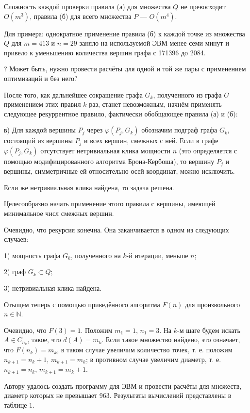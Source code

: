 \documentclass{article}
\begin{document}
Сложность каждой проверки правила (а) для множества $Q$ не превосходит $O(m^3)$, правила (б) для всего множества $P$ --- $O(m^4)$.

Для примера: однократное применение правила (б) к каждой точке из множества $Q$ для $m=413$ и $n=29$ заняло на используемой ЭВМ менее семи минут и привело к уменьшению количества вершин графа с 171396 до 2084.

? Может быть, нужно провести расчёты для одной и той же пары с применением оптимизаций и без него?

После того, как дальнейшее сокращение графа $G_k$, полученного из графа $G$ применением этих правил $k$ раз, станет невозможным, начнём применять следующее рекуррентное правило, фактически обобщающее правила (а) и (б):

в)
Для каждой вершины $P_j$ через $\varphi(P_j,G_k)$ обозначим подграф графа $G_k$, состоящий из вершины $P_j$ и всех вершин, смежных с ней.
Если в графе $\varphi(P_j,G_k)$ отсутствует нетривиальная клика мощности $n$ (это определяется с помощью модифицированного алгоритма Брона-Кербоша), то вершину $P_j$ и вершины, симметричные ей относительно осей координат, можно исключить.

Если же нетривиальная клика найдена, то задача решена.

Целесообразно начать применение этого правила с вершины, имеющей минимальное числ смежных вершин.

Очевидно, что рекурсия конечна.
Она заканчивается в одном из следующих случаев:

1) мощность графа $G_k$, полученного на $k$-й итерации, меньше $n$;

2) граф $G_k \subset Q$;

3) нетривиальная клика найдена.



Отыщем теперь с помощью приведённого алгоритма $F(n)$ для произвольного $n \in \mathbb{N}$.

Очевидно, что $F(3) = 1$.
Положим $m_1=1$, $n_1=3$.
На $k$-м шаге будем искать $A \in C_{n_k}$, такое, что $d(A) = m_k$.
Если такое множество найдено, это означает, что $F(n_k)=m_k$,
в таком случае увеличим количество точек, т. е. положим $n_{k+1} = n_k +1$, $m_{k+1} = m_k$;
в противном случае увеличим диаметр, т. е. $n_{k+1} = n_k$, $m_{k+1} = m_k +1$.



Автору удалось создать программу для ЭВМ и провести расчёты для множеств, диаметр которых не превышает 963.
Результаты вычислений представлены в таблице 1.
\end{document}
